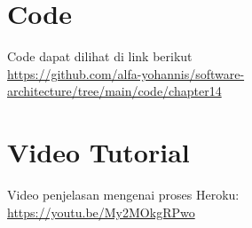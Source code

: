 \section{Code}
Code dapat dilihat di link berikut\\
\url{https://github.com/alfa-yohannis/software-architecture/tree/main/code/chapter14}

\section{Video Tutorial}
Video penjelasan mengenai proses Heroku:\\
\url{https://youtu.be/My2MOkgRPwo}